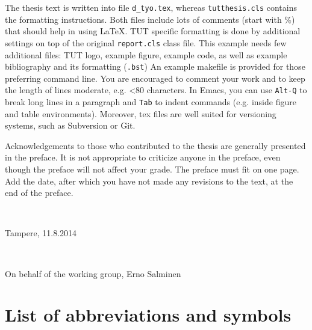 \documentclass[12pt,a4paper,english
]{tutthesis}
\begin{document}
The thesis text is written into file \texttt{d\_tyo.tex}, whereas
\texttt{tutthesis.cls} contains the formatting instructions. Both
files include lots of comments (start with \%) that should help in
using LaTeX. TUT specific formatting is done by additional settings on
top of the original \texttt{report.cls} class file. This example needs
few additional files: TUT logo, example figure, example code, as well
as example bibliography and its formatting (\texttt{.bst}) An example
makefile is provided for those preferring command line. You are
encouraged to comment your work and to keep the length of lines
moderate, e.g. <80 characters. In Emacs, you can use \texttt{Alt-Q} to
break long lines in a paragraph and \texttt{Tab} to indent commands
(e.g. inside figure and table environments). Moreover, tex files are
well suited for versioning systems, such as Subversion or Git.  

Acknowledgements to those who contributed to the thesis are generally
presented in the preface. It is not appropriate to criticize anyone in
the preface, even though the preface will not affect your grade. The
preface must fit on one page. Add the date, after which you have not
made any revisions to the text, at the end of the preface.

~ 

Tampere, 11.8.2014

~

On behalf of the working group, Erno Salminen



\setcounter{tocdepth}{3}              %
\tableofcontents                      %


%
%
\chapter*{List of abbreviations and symbols}
\markboth{}{}                                %
\end{document}
